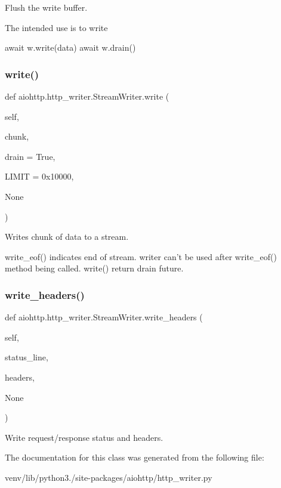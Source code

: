 \begin{DoxyVerb}Flush the write buffer.

The intended use is to write

  await w.write(data)
  await w.drain()
\end{DoxyVerb}
 \mbox{\label{classaiohttp_1_1http__writer_1_1_stream_writer_a25f7d4ab3ecc49c6de1c57a2adc9502f}} 
\subsubsection{\texorpdfstring{write()}{write()}}
{\footnotesize\ttfamily def aiohttp.\+http\+\_\+writer.\+Stream\+Writer.\+write (\begin{DoxyParamCaption}\item[{}]{self,  }\item[{}]{chunk,  }\item[{}]{drain = {\ttfamily True},  }\item[{}]{L\+I\+M\+IT = {\ttfamily 0x10000},  }\item[{}]{None }\end{DoxyParamCaption})}

\begin{DoxyVerb}Writes chunk of data to a stream.

write_eof() indicates end of stream.
writer can't be used after write_eof() method being called.
write() return drain future.
\end{DoxyVerb}
 \mbox{\label{classaiohttp_1_1http__writer_1_1_stream_writer_abbb79b9abf414dc7ce352766920ab868}} 
\subsubsection{\texorpdfstring{write\+\_\+headers()}{write\_headers()}}
{\footnotesize\ttfamily def aiohttp.\+http\+\_\+writer.\+Stream\+Writer.\+write\+\_\+headers (\begin{DoxyParamCaption}\item[{}]{self,  }\item[{}]{status\+\_\+line,  }\item[{}]{headers,  }\item[{}]{None }\end{DoxyParamCaption})}

\begin{DoxyVerb}Write request/response status and headers.\end{DoxyVerb}
 

The documentation for this class was generated from the following file\+:\begin{DoxyCompactItemize}
\item 
venv/lib/python3./site-\/packages/aiohttp/http\+\_\+writer.\+py\end{DoxyCompactItemize}
